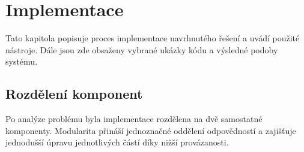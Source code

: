 \chapter{Implementace}

Tato kapitola popisuje proces implementace navrhnutého řešení a uvádí použité nástroje.
Dále jsou zde obsaženy vybrané ukázky kódu a výsledné podoby systému.

\section{Rozdělení komponent}

Po analýze problému byla implementace rozdělena na dvě samostatné komponenty. Modularita
přináší jednoznačné oddělení odpovědností a zajišťuje jednodušší úpravu jednotlivých částí
díky nižší provázanosti.










